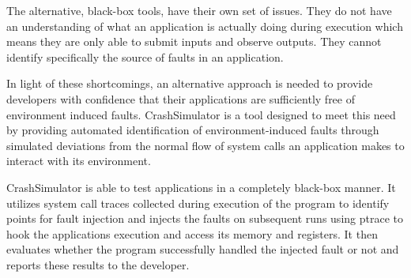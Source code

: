     The alternative, black-box tools, have their own set of issues. They do not have an understanding of what an
    application is actually doing during execution which means they are only able to submit inputs and observe outputs.
    They cannot identify specifically the source of faults in an application.

    In light of these shortcomings, an alternative approach is needed to provide developers with confidence that their
    applications are sufficiently free of environment induced faults.  CrashSimulator is a tool designed to meet this
    need by providing automated identification of environment-induced faults through simulated deviations from the
    normal flow of system calls an application makes to interact with its environment.

    CrashSimulator is able to test applications in a completely black-box manner. It utilizes system call traces
    collected during execution of the program to identify points for fault injection and injects the faults on
    subsequent runs using ptrace to hook the applications execution and access its memory and registers. It then
    evaluates whether the program successfully handled the injected fault or not and reports these results to the
    developer.


